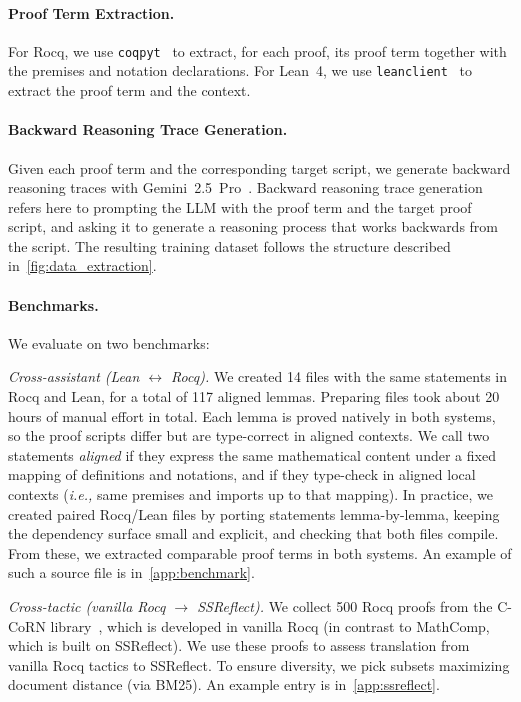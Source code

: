 \documentclass{article}
\theoremstyle{plain}
\theoremstyle{definition}
\theoremstyle{remark}
\newcommand{\ie}{\emph{i.e.,}\xspace}
\begin{document}
	\paragraph{Proof Term Extraction.}
	For Rocq, we use \texttt{coqpyt}~\cite{coqpyt2024} to extract, for each proof, its proof term together with the premises and notation declarations. For Lean~4, we use \texttt{leanclient}~\cite{leanclient2025} to extract the proof term and the context.
	
	\paragraph{Backward Reasoning Trace Generation.}
	Given each proof term and the corresponding target script, we generate backward reasoning traces with Gemini~2.5~Pro~\cite{gemini2024}. Backward reasoning trace generation refers here to prompting the LLM with the proof term and the target proof script, and asking it to generate a reasoning process that works backwards from the script. The resulting training dataset follows the structure described in~\cref{fig:data_extraction}.
	
	\paragraph{Benchmarks.}
	\label{benchmarks}
	We evaluate on two benchmarks:
	
	\emph{Cross-assistant (Lean \texorpdfstring{$\leftrightarrow$}{<->} Rocq).}
	We created 14 files with the same statements in Rocq and Lean, for a total of 117 aligned lemmas. Preparing files took about 20 hours of manual effort in total. Each lemma is proved natively in both systems, so the proof scripts differ but are type-correct in aligned contexts.
	We call two statements \emph{aligned} if they express the same mathematical content under a fixed mapping of definitions and notations, and if they type-check in aligned local contexts (\ie same premises and imports up to that mapping).
	In practice, we created paired Rocq/Lean files by porting statements lemma-by-lemma, keeping the dependency surface small and explicit, and checking that both files compile.
	From these, we extracted comparable proof terms in both systems. An example of such a source file is in~\cref{app:benchmark}.
	
	\emph{Cross-tactic (vanilla Rocq \texorpdfstring{$\to$}{->} SSReflect).}
	We collect 500 Rocq proofs from the C-CoRN library~\cite{corn}, which is developed in vanilla Rocq (in contrast to MathComp, which is built on SSReflect). We use these proofs to assess translation from vanilla Rocq tactics to SSReflect. To ensure diversity, we pick subsets maximizing document distance (via BM25). An example entry is in~\cref{app:ssreflect}.
	
\end{document}
